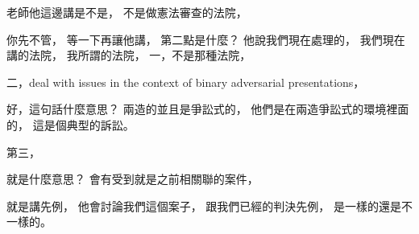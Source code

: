 \hypertarget{w06:cue:1662}{}老師他這邊講是不是，
\hypertarget{w06:cue:1663}{}不是做憲法審查的法院，

\hypertarget{w06:cue:1664}{}你先不管，
\hypertarget{w06:cue:1665}{}等一下再讓他講，
\hypertarget{w06:cue:1666}{}第二點是什麼？
\hypertarget{w06:cue:1667}{}他說我們現在處理的，
\hypertarget{w06:cue:1668}{}我們現在講的法院，
\hypertarget{w06:cue:1669}{}我所謂的法院，
\hypertarget{w06:cue:1670}{}一，不是那種法院，

\hypertarget{w06:cue:1671}{}二，deal with issues in the context of binary adversarial presentations，

\hypertarget{w06:cue:1672}{}好，這句話什麼意思？
\hypertarget{w06:cue:1673}{}兩造的並且是爭訟式的，
\hypertarget{w06:cue:1674}{}他們是在兩造爭訟式的環境裡面的，
\hypertarget{w06:cue:1675}{}這是個典型的訴訟。

\hypertarget{w06:cue:1676}{}第三，

\hypertarget{w06:cue:1677}{}就是什麼意思？
\hypertarget{w06:cue:1678}{}會有受到就是之前相關聯的案件，

\hypertarget{w06:cue:1679}{}就是講先例，
\hypertarget{w06:cue:1680}{}他會討論我們這個案子，
\hypertarget{w06:cue:1681}{}跟我們已經的判決先例，
\hypertarget{w06:cue:1682}{}是一樣的還是不一樣的。

